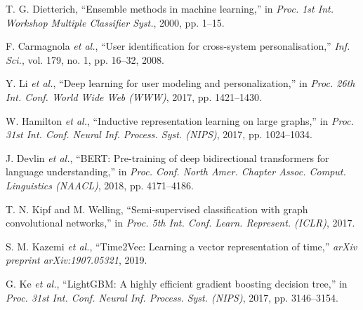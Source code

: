 \documentclass[conference]{IEEEtran}
\begin{document}
\begin{thebibliography}{00}
 T. G. Dietterich, ``Ensemble methods in machine learning,'' in \emph{Proc. 1st Int. Workshop Multiple Classifier Syst.}, 2000, pp. 1--15.

 F. Carmagnola \emph{et al.}, ``User identification for cross-system personalisation,'' \emph{Inf. Sci.}, vol. 179, no. 1, pp. 16--32, 2008.

 Y. Li \emph{et al.}, ``Deep learning for user modeling and personalization,'' in \emph{Proc. 26th Int. Conf. World Wide Web (WWW)}, 2017, pp. 1421--1430.

 W. Hamilton \emph{et al.}, ``Inductive representation learning on large graphs,'' in \emph{Proc. 31st Int. Conf. Neural Inf. Process. Syst. (NIPS)}, 2017, pp. 1024--1034.

 J. Devlin \emph{et al.}, ``BERT: Pre-training of deep bidirectional transformers for language understanding,'' in \emph{Proc. Conf. North Amer. Chapter Assoc. Comput. Linguistics (NAACL)}, 2018, pp. 4171--4186.

 T. N. Kipf and M. Welling, ``Semi-supervised classification with graph convolutional networks,'' in \emph{Proc. 5th Int. Conf. Learn. Represent. (ICLR)}, 2017.

 S. M. Kazemi \emph{et al.}, ``Time2Vec: Learning a vector representation of time,'' \emph{arXiv preprint arXiv:1907.05321}, 2019.

 G. Ke \emph{et al.}, ``LightGBM: A highly efficient gradient boosting decision tree,'' in \emph{Proc. 31st Int. Conf. Neural Inf. Process. Syst. (NIPS)}, 2017, pp. 3146--3154.

\end{thebibliography}
\end{document}
